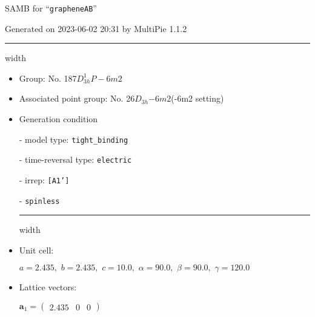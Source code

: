 \documentclass[fleqn,10pt,landscape]{article}
\begin{document}
\setcounter{MaxMatrixCols}{16}

\setlength{\baselineskip}{16pt}
\footnotesize
\begin{center}
\LARGE
SAMB for ``\texttt{grapheneAB}''
\end{center}
\begin{flushright}
Generated on 2023-06-02 20:31 by MultiPie 1.1.2
\end{flushright}
\vspace{1cm}


 \hfil \hrule height 1mm width \textwidth \hfil

\begin{itemize}
\item Group: No. 187\quad$D_{3h}^{1}$\quad$P-6m2$\quad[ hexagonal ]

\item Associated point group: No. 26\quad$D_{3h}$\quad$-6m2$\quad(-6m2 setting)\quad[ hexagonal ]

\vspace{5mm}

\item Generation condition

\quad - model type: \texttt{tight_binding}

\quad - time-reversal type: \texttt{electric}

\quad - irrep: \texttt{[A1']}

\quad - \texttt{spinless}


 \hfil \hrule height 1mm width \textwidth \hfil

\item Unit cell:

\quad $a=2.435,\,\, b=2.435,\,\, c=10.0,\,\, \alpha=90.0,\,\, \beta=90.0,\,\, \gamma=120.0$

\item Lattice vectors:

\quad $\bm{a}_1=\begin{pmatrix} 2.435 & 0 & 0 \end{pmatrix}$


\end{itemize}
\end{document}
